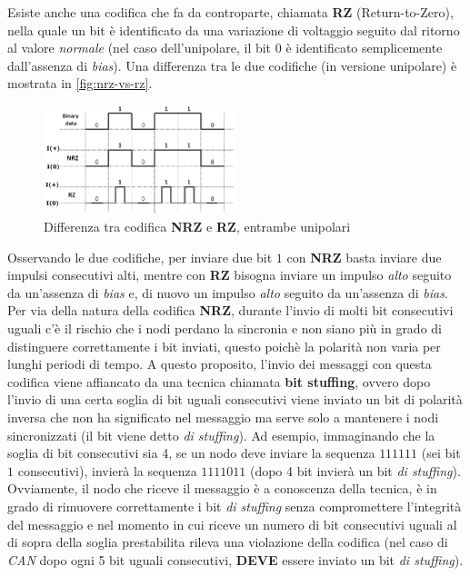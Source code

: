 Esiste anche una codifica che fa da controparte, chiamata \textbf{RZ} (Return-to-Zero), nella quale un bit è identificato da una variazione di voltaggio seguito dal ritorno al valore \emph{normale} (nel caso dell'unipolare, il bit $0$ è identificato semplicemente dall'assenza di \emph{bias}). Una differenza tra le due codifiche (in versione unipolare) è mostrata in \autoref{fig:nrz-vs-rz}.
\begin{figure}[h]
    \centering
    \includegraphics[width=0.5\textwidth]{capitoli/figure-protocolli/nrz-vs-rz.png}
    \caption{Differenza tra codifica \textbf{NRZ} e \textbf{RZ}, entrambe unipolari}
    \label{fig:nrz-vs-rz}
\end{figure}

Osservando le due codifiche, per inviare due bit $1$ con \textbf{NRZ} basta inviare due impulsi consecutivi alti, mentre con \textbf{RZ} bisogna inviare un impulso \emph{alto} seguito da un'assenza di \emph{bias} e, di nuovo un impulso \emph{alto} seguito da un'assenza di \emph{bias}. \cite{wikipedia_nrz}\\
Per via della natura della codifica \textbf{NRZ}, durante l'invio di molti bit consecutivi uguali c'è il rischio che i nodi perdano la sincronia e non siano più in grado di distinguere correttamente i bit inviati, questo poichè la polarità non varia per lunghi periodi di tempo. A questo proposito, l'invio dei messaggi con questa codifica viene affiancato da una tecnica chiamata \textbf{bit stuffing}, ovvero dopo l'invio di una certa soglia di bit uguali consecutivi viene inviato un bit di polarità inversa che non ha significato nel messaggio ma serve solo a mantenere i nodi sincronizzati (il bit viene detto \emph{di stuffing}). Ad esempio, immaginando che la soglia di bit consecutivi sia 4, se un nodo deve inviare la sequenza $111111$ (sei bit $1$ consecutivi), invierà la sequenza $1111011$ (dopo 4 bit invierà un bit \emph{di stuffing}). Ovviamente, il nodo che riceve il messaggio è a conoscenza della tecnica, è in grado di rimuovere correttamente i bit \emph{di stuffing} senza compromettere l'integrità del messaggio e nel momento in cui riceve un numero di bit consecutivi uguali al di sopra della soglia prestabilita rileva una violazione della codifica (nel caso di \emph{CAN} dopo ogni 5 bit uguali consecutivi, \textbf{DEVE} essere inviato un bit \emph{di stuffing}).

